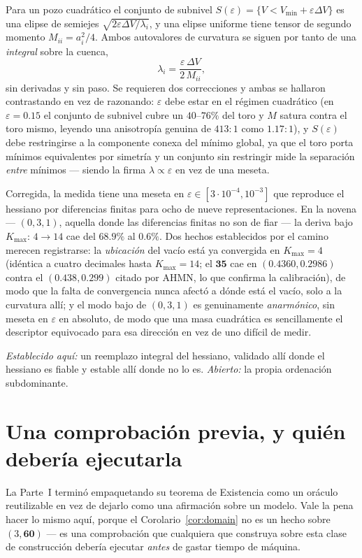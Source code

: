 \documentclass[11pt,a4paper]{article}
\begin{document}
Para un pozo cuadrático el conjunto de subnivel $S(\varepsilon)=\{V<V_{\min}+\varepsilon\Delta V\}$
es una elipse de semiejes $\sqrt{2\varepsilon\Delta V/\lambda_i}$, y una elipse uniforme tiene
tensor de segundo momento $M_{ii}=a_i^2/4$. Ambos autovalores de curvatura se siguen por tanto
de una \emph{integral} sobre la cuenca,
\begin{equation}
\lambda_i=\frac{\varepsilon\,\Delta V}{2\,M_{ii}},
\end{equation}
sin derivadas y sin paso. Se requieren dos correcciones y ambas se hallaron contrastando en
vez de razonando: $\varepsilon$ debe estar en el régimen cuadrático (en $\varepsilon=0.15$ el
conjunto de subnivel cubre un $40$--$76\%$ del toro y $M$ satura contra el toro mismo, leyendo
una anisotropía genuina de $413{:}1$ como $1.17{:}1$), y $S(\varepsilon)$ debe restringirse a
la componente conexa del mínimo global, ya que el toro porta mínimos equivalentes por simetría
y un conjunto sin restringir mide la separación \emph{entre} mínimos --- siendo la firma
$\lambda\propto\varepsilon$ en vez de una meseta.

Corregida, la medida tiene una meseta en $\varepsilon\in[3\cdot10^{-4},10^{-3}]$ que reproduce
el hessiano por diferencias finitas para ocho de nueve representaciones. En la novena ---
$(0,3,1)$, aquella donde las diferencias finitas no son de fiar --- la deriva bajo
$K_{\max}\!:\,4\to14$ cae del $68.9\%$ al $0.6\%$. Dos hechos establecidos por el camino
merecen registrarse: la \emph{ubicación} del vacío está ya convergida en $K_{\max}=4$
(idéntica a cuatro decimales hasta $K_{\max}=14$; el $\mathbf{35}$ cae en $(0.4360,0.2986)$
contra el $(0.438,0.299)$ citado por AHMN, lo que confirma la calibración), de modo que la
falta de convergencia nunca afectó a dónde está el vacío, solo a la curvatura allí; y el modo
bajo de $(0,3,1)$ es genuinamente \emph{anarmónico}, sin meseta en $\varepsilon$ en absoluto,
de modo que una masa cuadrática es sencillamente el descriptor equivocado para esa dirección
en vez de uno difícil de medir.

\emph{Establecido aquí:} un reemplazo integral del hessiano, validado allí donde el hessiano es
fiable y estable allí donde no lo es. \emph{Abierto:} la propia ordenación subdominante.

\section{Una comprobación previa, y quién debería ejecutarla}\label{sec:tool}
La Parte~I terminó empaquetando su teorema de Existencia como un oráculo reutilizable en vez
de dejarlo como una afirmación sobre un modelo. Vale la pena hacer lo mismo aquí, porque el
Corolario~\ref{cor:domain} no es un hecho sobre $(3,\mathbf{60})$ --- es una comprobación que
cualquiera que construya sobre esta clase de construcción debería ejecutar \emph{antes} de
gastar tiempo de máquina.
\end{document}
